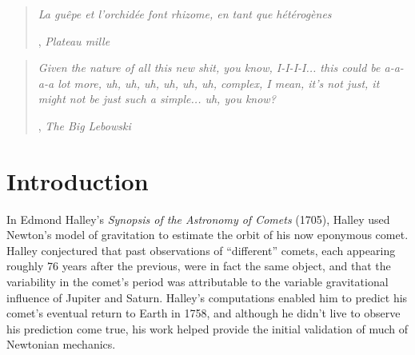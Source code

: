 \pagebreak

\begin{quote}
\begin{flushright}
\textit{La guêpe et l'orchidée font rhizome, en tant que hétérogènes}\end{flushright}

\begin{flushright}
, \textit{Plateau mille} \end{flushright}

\end{quote}

\begin{quote}
\begin{flushright}
\textit{Given the nature of all this new shit, you know, I-I-I-I... this could be a-a-a-a lot more, uh, uh, uh, uh, uh, uh, complex, I mean, it's not just, it might not be just such a simple... uh, you know?} \end{flushright}

\begin{flushright}
, \textit{The Big Lebowski }  \end{flushright}
\end{quote}

\hypertarget{introduction}{%
\section{Introduction}\label{introduction}}

In Edmond Halley's \emph{Synopsis of the Astronomy of Comets} (1705),
Halley used Newton's model of gravitation to estimate the orbit of his
now eponymous comet. Halley conjectured that past observations of
``different'' comets, each appearing roughly 76 years after the
previous, were in fact the same object, and that the variability in the
comet's period was attributable to the variable gravitational influence
of Jupiter and Saturn. Halley's computations enabled him to predict his
comet's eventual return to Earth in 1758, and although he didn't live to
observe his prediction come true, his work helped provide the initial
validation of much of Newtonian mechanics.

